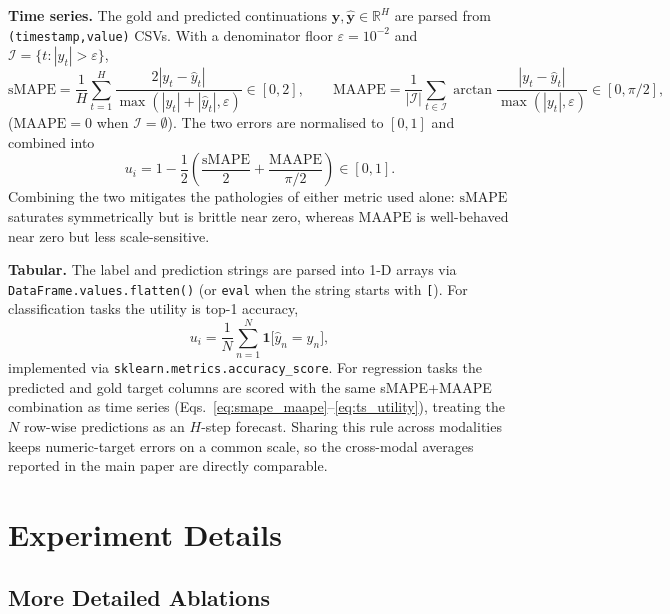 \documentclass{llmxive}
\begin{document}
{\textbf{Time series.}
The gold and predicted continuations $\mathbf{y},\hat{\mathbf{y}}\in\mathbb{R}^{H}$ are parsed from \texttt{(timestamp,value)} CSVs. With a denominator floor $\varepsilon{=}10^{-2}$ and $\mathcal{I}{=}\{t:|y_t|{>}\varepsilon\}$,
\begin{equation}
\mathrm{sMAPE} = \frac{1}{H}\sum_{t=1}^{H} \frac{2|y_t-\hat{y}_t|}{\max(|y_t|+|\hat{y}_t|,\varepsilon)} \in [0,2], \qquad
\mathrm{MAAPE} = \frac{1}{|\mathcal{I}|}\sum_{t\in\mathcal{I}} \arctan\!\frac{|y_t-\hat{y}_t|}{\max(|y_t|,\varepsilon)} \in [0,\pi/2],
\label{eq:smape_maape}
\end{equation}
($\mathrm{MAAPE}{=}0$ when $\mathcal{I}{=}\emptyset$). The two errors are normalised to $[0,1]$ and combined into
\begin{equation}
u_i = 1 - \frac{1}{2}\!\left(\frac{\mathrm{sMAPE}}{2} + \frac{\mathrm{MAAPE}}{\pi/2}\right) \in [0,1].
\label{eq:ts_utility}
\end{equation}
Combining the two mitigates the pathologies of either metric used alone: $\mathrm{sMAPE}$ saturates symmetrically but is brittle near zero, whereas $\mathrm{MAAPE}$ is well-behaved near zero but less scale-sensitive.

\textbf{Tabular.}
The label and prediction strings are parsed into 1-D arrays via \texttt{DataFrame.values.flatten()} (or \texttt{eval} when the string starts with \texttt{[}). For classification tasks the utility is top-1 accuracy,
\begin{equation}
u_i = \frac{1}{N}\sum_{n=1}^{N} \mathbf{1}\!\bigl[\hat{y}_n = y_n\bigr],
\label{eq:tab_cls}
\end{equation}
implemented via \texttt{sklearn.metrics.accuracy\_score}. For regression tasks the predicted and gold target columns are scored with the same sMAPE+MAAPE combination as time series (Eqs.~\eqref{eq:smape_maape}--\eqref{eq:ts_utility}), treating the $N$ row-wise predictions as an $H$-step forecast. Sharing this rule across modalities keeps numeric-target errors on a common scale, so the cross-modal averages reported in the main paper are directly comparable.

\section{Experiment Details}
\label{app:experiment_details}


\subsection{More Detailed Ablations}
\label{ap:more_ablation}

}
\end{document}
